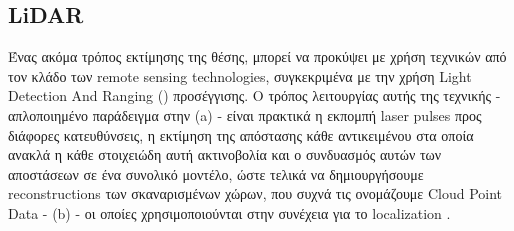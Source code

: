 \subsection{LiDAR} \label{sec:related-lidar}
Ένας ακόμα τρόπος εκτίμησης της θέσης, μπορεί να προκύψει με χρήση τεχνικών από τον κλάδο των  
remote sensing technologies, συγκεκριμένα με την χρήση Light Detection And Ranging () προσέγγισης. Ο τρόπος λειτουργίας αυτής της τεχνικής - απλοποιημένο παράδειγμα στην  (a) - είναι πρακτικά η εκπομπή laser pulses προς διάφορες κατευθύνσεις, η εκτίμηση της απόστασης κάθε αντικειμένου στα οποία ανακλά η κάθε στοιχειώδη αυτή ακτινοβολία και ο συνδυασμός αυτών των αποστάσεων σε ένα συνολικό μοντέλο, ώστε τελικά να δημιουργήσουμε  reconstructions των σκαναρισμένων χώρων, που συχνά τις ονομάζουμε  Cloud Point Data -  (b) -  οι οποίες χρησιμοποιούνται στην συνέχεια για το localization \cite{lidar-basics}.

